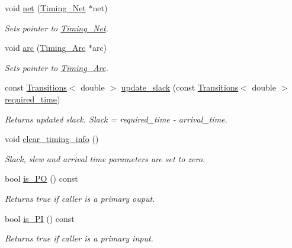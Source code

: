 \begin{DoxyCompactItemize}
void \hyperlink{classTiming__Analysis_1_1Timing__Point_ab17571917e751e2d9bdd8dc11404bb66}{net} (\hyperlink{classTiming__Analysis_1_1Timing__Net}{Timing\-\_\-\-Net} $\ast$net)
\begin{DoxyCompactList}\small\item\em Sets pointer to \hyperlink{classTiming__Analysis_1_1Timing__Net}{Timing\-\_\-\-Net}. \end{DoxyCompactList}\item 
void \hyperlink{classTiming__Analysis_1_1Timing__Point_a7db0f9baed61c0534e19c2009ac41db5}{arc} (\hyperlink{classTiming__Analysis_1_1Timing__Arc}{Timing\-\_\-\-Arc} $\ast$arc)
\begin{DoxyCompactList}\small\item\em Sets pointer to \hyperlink{classTiming__Analysis_1_1Timing__Arc}{Timing\-\_\-\-Arc}. \end{DoxyCompactList}\item 
const \hyperlink{classTransitions}{Transitions}$<$ double $>$ \hyperlink{classTiming__Analysis_1_1Timing__Point_a62c2af027f267f45294b593f880bfe2d}{update\-\_\-slack} (const \hyperlink{classTransitions}{Transitions}$<$ double $>$ \hyperlink{classTiming__Analysis_1_1Timing__Point_aab60710f64cbc89f7316515aaca8ea17}{required\-\_\-time})
\begin{DoxyCompactList}\small\item\em Returns updated slack. Slack = required\-\_\-time -\/ arrival\-\_\-time. \end{DoxyCompactList}\item 
void \hyperlink{classTiming__Analysis_1_1Timing__Point_a737bfc39dc3271c9b605d1d16ba8816c}{clear\-\_\-timing\-\_\-info} ()
\begin{DoxyCompactList}\small\item\em Slack, slew and arrival time parameters are set to zero. \end{DoxyCompactList}\item 
bool \hyperlink{classTiming__Analysis_1_1Timing__Point_a2223c8ec07ef018d39db5c7e03df90a9}{is\-\_\-\-P\-O} () const 
\begin{DoxyCompactList}\small\item\em Returns true if caller is a primary ouput. \end{DoxyCompactList}\item 
bool \hyperlink{classTiming__Analysis_1_1Timing__Point_a0c943d53edbf2fbffa188ebf883a5b9f}{is\-\_\-\-P\-I} () const 
\begin{DoxyCompactList}\small\item\em Returns true if caller is a primary input. \end{DoxyCompactList}\item 

\end{DoxyCompactItemize}

